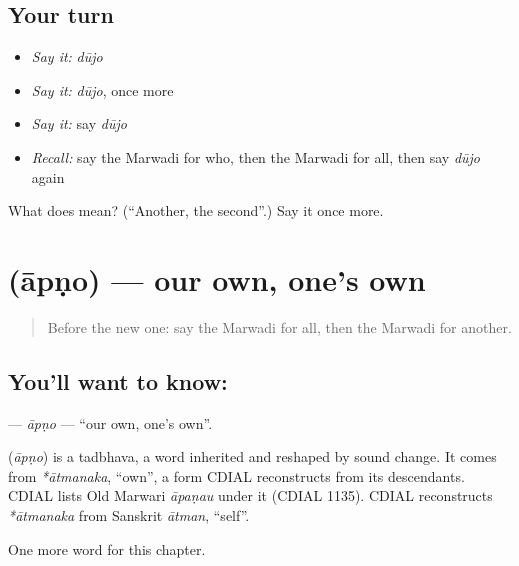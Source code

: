 \subsection*{Your turn}
\begin{itemize}
\raggedright
  \item \emph{Say it:} \emph{dūjo}
  \item \emph{Say it:} \emph{dūjo}, once more
  \item \emph{Say it:} say \emph{dūjo}
  \item \emph{Recall:} say the Marwadi for who, then the Marwadi for all, then say \emph{dūjo} again
\end{itemize}

\begin{tcolorbox}[breakable,colback=teal!4,colframe=teal!35!black,title={Before you move on}]
What does  mean? (\textquotedblleft{}Another, the second\textquotedblright{}.) Say it once more.
\end{tcolorbox}
\section[\texorpdfstring{\mw{आपणो} (āpṇo)}{आपणो (āpṇo)}]{ (āpṇo) — our own, one's own}

\label{lesson:MW-C102-apno}



\begin{quote}
Before the new one: say the Marwadi for all, then the Marwadi for another.
\end{quote}

\subsection*{You'll want to know: }
\textbf{} — \emph{āpṇo} — \textquotedblleft{}our own, one's own\textquotedblright{}.

\begin{cousinweb}
\textbf{} (\emph{āpṇo}) is a tadbhava, a word inherited and reshaped by sound change. It comes from \emph{*ātmanaka}, \textquotedblleft{}own\textquotedblright{}, a form CDIAL reconstructs from its descendants. CDIAL lists Old Marwari \emph{āpaṇau} under it (CDIAL 1135). CDIAL reconstructs \emph{*ātmanaka} from Sanskrit \emph{ātman}, \textquotedblleft{}self\textquotedblright{}.
\end{cousinweb}

\begin{grammarlens}[title={What you've built}]
One more word for this chapter.
\end{grammarlens}

